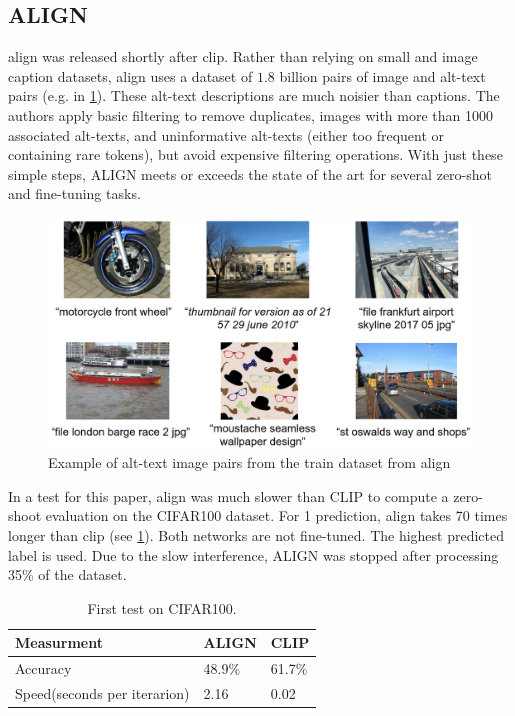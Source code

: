         \subsection{ALIGN
            \label{section:align}}
        \acrfull{align}\cite{ALIGN} was released shortly after \acrshort{clip}.
        Rather than relying on small and image caption datasets, \acrshort{align} uses a dataset of \(1.8\) billion pairs of image and alt-text pairs (e.g. in \cref{fig:crossmodalnetworks:alignepairs}).
        These alt-text descriptions are much noisier than captions.
        The authors apply basic filtering to remove duplicates, images with more than 1000 associated alt-texts, and uninformative alt-texts (either too frequent or containing rare tokens), but avoid expensive filtering operations.
        With just these simple steps, ALIGN meets or exceeds the state of the art for several zero-shot and fine-tuning tasks.
        \begin{figure}
            \centering
            \includegraphics[width=\textwidth]{Images/crossmodalnetworks/examplepicsalign.png}
            \caption{Example of alt-text image pairs from the train dataset from \acrshort{align}}
            \label{fig:crossmodalnetworks:alignepairs}
        \end{figure}

        In a test for this paper, \acrshort{align} was much slower than CLIP to compute a zero-shoot evaluation on the CIFAR100\cite{cifar100} dataset.
        For 1 prediction, \acrshort{align} takes 70 times longer than \acrshort{clip} (see \cref{tab:clipaligntest}).
        Both networks are not fine-tuned. The highest predicted label is used. Due to the slow interference, ALIGN was stopped after processing 35\% of the dataset.

        \begin{table}
            \centering
            \begin{tabular}{lll}
                \hline
            \textbf{Measurment}&\textbf{ALIGN}&\textbf{CLIP}\\\hline
            Accuracy& 48.9\% & 61.7\%\\
            Speed(seconds per iterarion)&  2.16&  0.02\\ \hline
            \end{tabular}
            \caption{First test on CIFAR100.}
            \label{tab:clipaligntest}
        \end{table}

